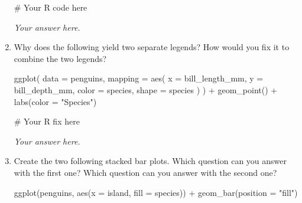 \documentclass[
  letterpaper,
  DIV=11,
  numbers=noendperiod]{scrreprt}
\newenvironment{Shaded}{\begin{snugshade}}{\end{snugshade}}
\newcommand{\AttributeTok}[1]{\textcolor[rgb]{0.40,0.45,0.13}{#1}}
\newcommand{\CommentTok}[1]{\textcolor[rgb]{0.37,0.37,0.37}{#1}}
\newcommand{\FunctionTok}[1]{\textcolor[rgb]{0.28,0.35,0.67}{#1}}
\newcommand{\NormalTok}[1]{\textcolor[rgb]{0.00,0.23,0.31}{#1}}
\newcommand{\SpecialCharTok}[1]{\textcolor[rgb]{0.37,0.37,0.37}{#1}}
\newcommand{\StringTok}[1]{\textcolor[rgb]{0.13,0.47,0.30}{#1}}
\begin{document}
\begin{enumerate}
\begin{tcolorbox}
\begin{Shaded}
\begin{Highlighting}[]
\CommentTok{\# Your R code here}
\end{Highlighting}
\end{Shaded}

  \emph{Your answer here.}

  \end{tcolorbox}
\item
  Why does the following yield two separate legends? How would you fix
  it to combine the two legends?

\begin{Shaded}
\begin{Highlighting}[]
\FunctionTok{ggplot}\NormalTok{(}
  \AttributeTok{data =}\NormalTok{ penguins,}
  \AttributeTok{mapping =} \FunctionTok{aes}\NormalTok{(}
    \AttributeTok{x =}\NormalTok{ bill\_length\_mm, }\AttributeTok{y =}\NormalTok{ bill\_depth\_mm, }
    \AttributeTok{color =}\NormalTok{ species, }\AttributeTok{shape =}\NormalTok{ species}
\NormalTok{  )}
\NormalTok{) }\SpecialCharTok{+}
  \FunctionTok{geom\_point}\NormalTok{() }\SpecialCharTok{+}
  \FunctionTok{labs}\NormalTok{(}\AttributeTok{color =} \StringTok{"Species"}\NormalTok{)}
\end{Highlighting}
\end{Shaded}

  \begin{tcolorbox}[enhanced jigsaw, breakable, bottomtitle=1mm, left=2mm, colback=white, toprule=.15mm, leftrule=.75mm, colframe=quarto-callout-note-color-frame, colbacktitle=quarto-callout-note-color!10!white, title={Answer}, coltitle=black, toptitle=1mm, bottomrule=.15mm, opacitybacktitle=0.6, arc=.35mm, rightrule=.15mm, titlerule=0mm, opacityback=0]

\begin{Shaded}
\begin{Highlighting}[]
\CommentTok{\# Your R fix here}
\end{Highlighting}
\end{Shaded}

  \emph{Your answer here.}

  \end{tcolorbox}
\item
  Create the two following stacked bar plots. Which question can you
  answer with the first one? Which question can you answer with the
  second one?

\begin{Shaded}
\begin{Highlighting}[]
\FunctionTok{ggplot}\NormalTok{(penguins, }\FunctionTok{aes}\NormalTok{(}\AttributeTok{x =}\NormalTok{ island, }\AttributeTok{fill =}\NormalTok{ species)) }\SpecialCharTok{+}
  \FunctionTok{geom\_bar}\NormalTok{(}\AttributeTok{position =} \StringTok{"fill"}\NormalTok{)}
\end{Highlighting}
\end{Shaded}


\end{enumerate}
\end{document}
